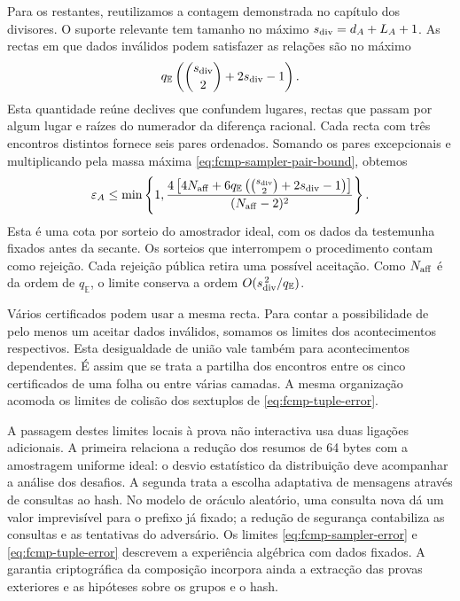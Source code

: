 Para os restantes, reutilizamos a contagem demonstrada
no capítulo dos divisores. O suporte relevante tem tamanho
no máximo \(s_{\rm div}=d_A+L_A+1\). As rectas em
que dados inválidos podem satisfazer as relações são no
máximo
\[
 q_{\mathbb E}
       \left(\binom{s_{\rm div}}2+2s_{\rm div}-1\right).
\]
Esta quantidade reúne declives que confundem lugares,
rectas que passam por algum lugar e raízes do numerador
da diferença racional. Cada recta com três encontros
distintos fornece seis pares ordenados. Somando os pares
excepcionais e multiplicando pela massa máxima
\eqref{eq:fcmp-sampler-pair-bound}, obtemos
\begin{equation}
 \varepsilon_A\leq
 \min\left\{1,
 \frac{4\left[4N_{\rm aff}+6q_{\mathbb E}
       \left(\binom{s_{\rm div}}2+2s_{\rm div}-1\right)\right]}
      {(N_{\rm aff}-2)^2}\right\}.
 \label{eq:fcmp-sampler-error}
\end{equation}
Esta é uma cota por sorteio do amostrador ideal, com os dados da
testemunha fixados antes da secante. Os sorteios que interrompem o
procedimento contam como rejeição. Cada
rejeição pública retira uma possível aceitação.
Como \(N_{\rm aff}\) é da ordem de \(q_{\mathbb E}\),
o limite conserva a ordem
\(O(s_{\rm div}^{\,2}/q_{\mathbb E})\).

Vários certificados podem usar a mesma recta. Para contar
a possibilidade de pelo menos um aceitar dados inválidos,
somamos os limites dos acontecimentos respectivos.
Esta desigualdade de união vale também para acontecimentos
dependentes. É assim que se trata a partilha dos encontros
entre os cinco certificados de uma folha ou entre várias
camadas. A mesma organização acomoda os limites de colisão
dos sextuplos de \eqref{eq:fcmp-tuple-error}.

A passagem destes limites locais à prova não interactiva
usa duas ligações adicionais. A primeira relaciona a redução
dos resumos de 64 bytes com a amostragem uniforme ideal:
o desvio estatístico da distribuição deve acompanhar a
análise dos desafios. A segunda trata a escolha adaptativa
de mensagens através de consultas ao hash. No modelo de
oráculo aleatório, uma consulta nova dá um valor imprevisível
para o prefixo já fixado; a redução de segurança contabiliza
as consultas e as tentativas do adversário. Os limites
\eqref{eq:fcmp-sampler-error} e \eqref{eq:fcmp-tuple-error}
descrevem a experiência algébrica com dados fixados.
A garantia criptográfica da composição incorpora ainda
a extracção das provas exteriores e as hipóteses sobre
os grupos e o hash.

